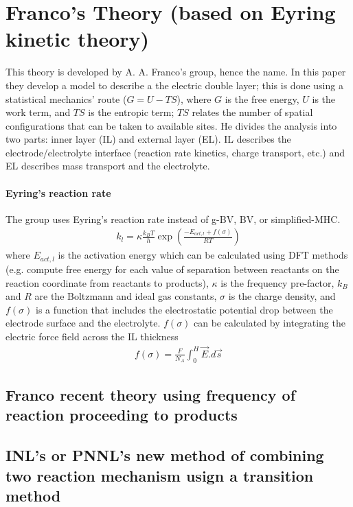\documentclass[12pt]{book}
\begin{document}
\section{Franco's Theory (based on Eyring kinetic theory)}
This theory is developed by A. A. Franco's group, hence the name. In this paper they develop a model to describe a the electric double layer; this is done using a statistical mechanics' route ($G=U - TS$), where $G$ is the free energy, $U$ is the work term, and $TS$ is the entropic term; $TS$ relates the number of spatial configurations that can be taken to available sites. He divides the analysis into two parts: inner layer (IL) and external layer (EL). IL describes the electrode/electrolyte interface (reaction rate kinetics, charge transport, etc.) and EL describes mass transport and the electrolyte.
\paragraph{Eyring's reaction rate}
The group uses Eyring's reaction rate instead of g-BV, BV, or simplified-MHC.
\begin{align}
k_{l}=\kappa\frac{k_{B}T}{h}\exp\left(\frac{-E_{act,l}+f\left(\sigma\right)}{RT}\right)
\label{eq:Eyring_reaction_rate}
\end{align}where $E_{act,l}$ is the activation energy which can be calculated using DFT methods (e.g. compute free energy for each value of separation between reactants on the reaction coordinate from reactants to products), $\kappa$ is the frequency pre-factor, $k_B$ and $R$ are the Boltzmann and ideal gas constants, $\sigma$ is the charge density, and $f\left(\sigma\right)$ is a function that includes the electrostatic potential drop between the electrode surface and the electrolyte.
$f\left(\sigma\right)$ can be calculated by integrating the electric force field across the IL thickness 
\begin{align}
 f\left(\sigma\right)=\frac{F}{N_A}\int_0^H\overrightarrow{E}.d\overrightarrow{s}
\end{align}
\subsection{Franco recent theory using frequency of reaction proceeding to products}

\subsection{INL's or PNNL's new method of combining two reaction mechanism usign a transition method}
\end{document}

